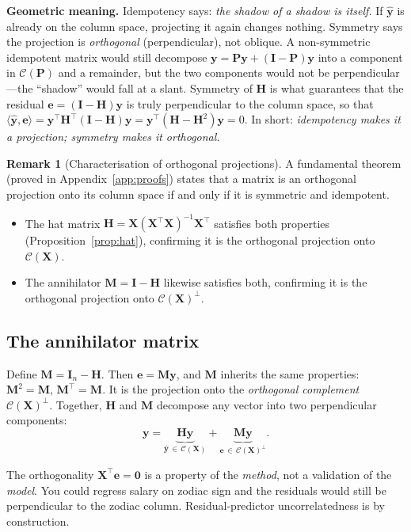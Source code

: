 \documentclass[11pt,a4paper]{article}
\theoremstyle{plain}
\theoremstyle{definition}
\newtheorem{remark}[theorem]{Remark}
\newcommand{\yhat}{\hat{\bm{y}}}
\newcommand{\bX}{\bm{X}}
\newcommand{\by}{\bm{y}}
\newcommand{\be}{\bm{e}}
\newcommand{\bH}{\bm{H}}
\newcommand{\bM}{\bm{M}}
\newcommand{\bI}{\bm{I}}
\newcommand{\Col}{\mathcal{C}}
\newcommand{\ip}[2]{\langle #1, #2 \rangle}
\begin{document}
\noindent\textbf{Geometric meaning.}
Idempotency says: \emph{the shadow of a shadow is itself.}
If $\yhat$ is already on the column space, projecting it again
changes nothing.
Symmetry says the projection is \emph{orthogonal} (perpendicular), not
oblique.
A non-symmetric idempotent matrix would still decompose
$\by = \bm{P}\by + (\bI - \bm{P})\by$ into a component in $\Col(\bm{P})$
and a remainder, but the two components would not be perpendicular---the
``shadow'' would fall at a slant.
Symmetry of $\bH$ is what guarantees that the residual $\be = (\bI-\bH)\by$
is truly perpendicular to the column space, so that
$\ip{\yhat}{\be} = \by^\top\bH^\top(\bI-\bH)\by = \by^\top(\bH - \bH^2)\by = 0$.
In short: \emph{idempotency makes it a projection; symmetry makes it orthogonal.}

\begin{remark}[Characterisation of orthogonal projections]
A fundamental theorem (proved in Appendix~\ref{app:proofs}) states that a
matrix is an orthogonal projection onto its column space if and only if it
is symmetric and idempotent.
\begin{itemize}[nosep]
  \item The hat matrix $\bH = \bX(\bX^\top\bX)^{-1}\bX^\top$ satisfies both
        properties (Proposition~\ref{prop:hat}), confirming it is the orthogonal
        projection onto $\Col(\bX)$.
  \item The annihilator $\bM = \bI - \bH$ likewise satisfies both, confirming
        it is the orthogonal projection onto $\Col(\bX)^\perp$.
\end{itemize}
\end{remark}

\subsection{The annihilator matrix}

Define $\bM = \bI_n - \bH$. Then $\be = \bM\by$, and $\bM$ inherits the
same properties: $\bM^2 = \bM$, $\bM^\top = \bM$.
It is the projection onto the \emph{orthogonal complement}
$\Col(\bX)^\perp$.
Together, $\bH$ and $\bM$ decompose any vector into two perpendicular
components:
\[
  \by = \underbrace{\bH\by}_{\yhat\,\in\,\Col(\bX)}
      + \underbrace{\bM\by}_{\be\,\in\,\Col(\bX)^\perp}.
\]

\begin{warning}
The orthogonality $\bX^\top\be=\bm{0}$ is a property of the
\emph{method}, not a validation of the \emph{model}.
You could regress salary on zodiac sign and the residuals would still
be perpendicular to the zodiac column.
Residual-predictor uncorrelatedness is by construction.
\end{warning}
\end{document}
